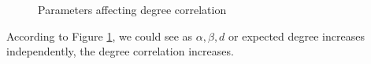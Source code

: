 \documentclass{article}
\begin{document}
\begin{itemize}
\begin{itemize}
\begin{figure}
\hfill
{}
\hfill
{}
\hfill
{}
\hfill
\caption{
\label{fig1}%
Parameters affecting degree correlation}
\end{figure}

According to Figure \ref{fig1}, we could see as $\alpha, \beta, d$ or expected degree increases independently, the degree correlation increases.


\end{itemize}

 
\end{itemize}
\end{document}
